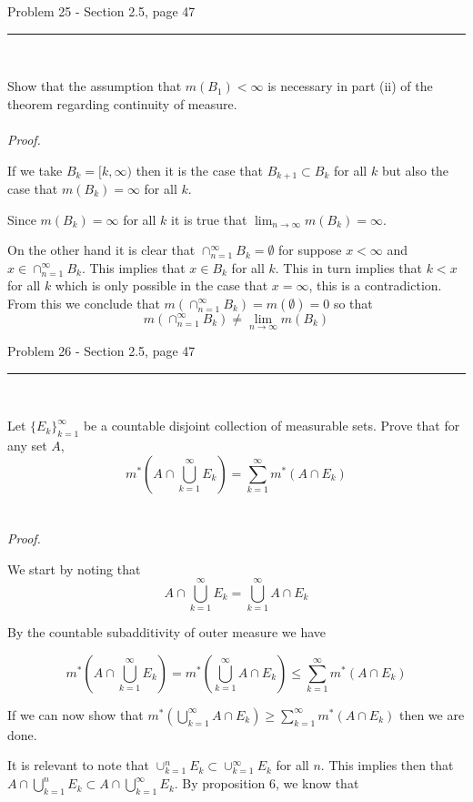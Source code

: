 \documentclass[11pt,reqno]{article}
\begin{document}
\begin{flushleft} 
Problem 25 - Section 2.5, page 47\\
\rule{500pt}{1pt}\\
\end{flushleft} 

Show that the assumption that $m(B_1) < \infty$ is necessary in part (ii) of the theorem regarding continuity of measure.
\\\\ \emph{Proof.}

If we take $B_k = [k, \infty)$ then it is the case that $B_{k+1} \subset B_k$ for all $k$ but also the case that $m(B_k) = \infty$  for all $k$. 

Since $m(B_k) = \infty$  for all $k$ it is true that $\lim_{n \to \infty} m(B_k) = \infty$.

On the other hand it is clear that $\cap_{n = 1}^\infty B_k = \emptyset$ for suppose $x < \infty$ and $x \in \cap_{n = 1}^\infty B_k$. This implies that $x \in B_k$ for all $k$. This in turn implies that $k < x$ for all $k$ which is only possible in the case that $x = \infty$, this is a contradiction. From this we conclude that $m(\cap_{n = 1}^\infty B_k) = m(\emptyset) = 0$ so that 
\[ m(\cap_{n = 1}^\infty B_k) \neq \lim_{n \to \infty} m(B_k) \]

\begin{flushleft} 
Problem 26 - Section 2.5, page 47\\
\rule{500pt}{1pt}\\
\end{flushleft} 

Let $\{E_k\}_{k=1}^\infty$ be a countable disjoint collection of measurable sets. Prove that for any set $A$,
\[ m^*(A \cap \bigcup_{k=1}^\infty E_k) = \sum_{k=1}^\infty m^*(A \cap E_k) \]
\\\\ \emph{Proof.}

We start by noting that 
\[  A \cap \bigcup_{k=1}^\infty E_k = \bigcup_{k=1}^\infty A \cap E_k \]

\noindent By the countable subadditivity of outer measure we have 

\[ m^*(A \cap \bigcup_{k=1}^\infty E_k) = m^*(\bigcup_{k=1}^\infty A \cap E_k) \le  \sum_{k=1}^\infty m^*(A \cap E_k)  \]

If we can now show that $m^*(\bigcup_{k=1}^\infty A \cap E_k) \ge  \sum_{k=1}^\infty m^*(A \cap E_k)$ then we are done.

\noindent It is relevant to note that $\cup_{k=1}^n E_k \subset \cup_{k=1}^\infty E_k$ for all $n$. This implies then that $A \cap \bigcup_{k=1}^n E_k \subset A\cap \bigcup_{k=1}^\infty E_k$. By proposition 6, we know that 
\end{document}
